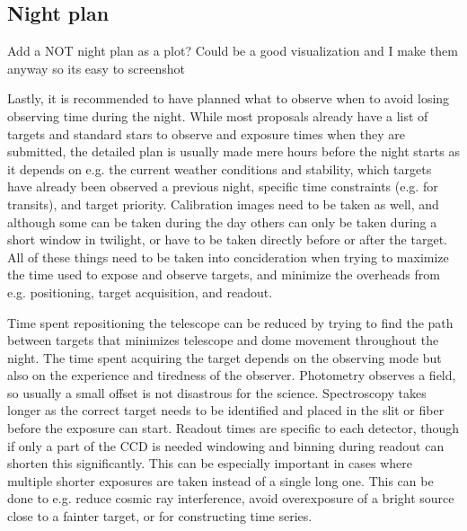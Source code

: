 \documentclass[a4paper,oneside,12pt, class=Latex/Classes/PhDthesisPSnPDF, crop=false]{standalone}
\begin{document}
\subsection{Night plan}
\color{red} Add a NOT night plan as a plot? Could be a good visualization and I make them anyway so its easy to screenshot \color{black}

Lastly, it is recommended to have planned what to observe when to avoid losing observing time during the night. While most proposals already have a list of targets and standard stars to observe and exposure times when they are submitted, the detailed plan is usually made mere hours before the night starts as it depends on e.g. the current weather conditions and stability, which targets have already been observed a previous night, specific time constraints (e.g. for transits), and target priority. Calibration images need to be taken as well, and although some can be taken during the day others can only be taken during a short window in twilight, or have to be taken directly before or after the target. All of these things need to be taken into concideration when trying to maximize the time used to expose and observe targets, and minimize the overheads from e.g. positioning, target acquisition, and readout.

Time spent repositioning the telescope can be reduced by trying to find the path between targets that minimizes telescope and dome movement throughout the night. The time spent acquiring the target depends on the observing mode but also on the experience and tiredness of the observer. Photometry observes a field, so usually a small offset is not disastrous for the science. Spectroscopy takes longer as the correct target needs to be identified and placed in the slit or fiber before the exposure can start. Readout times are specific to each detector, though if only a part of the CCD is needed windowing and binning during readout can shorten this significantly. This can be especially important in cases where multiple shorter exposures are taken instead of a single long one. This can be done to e.g. reduce cosmic ray interference, avoid overexposure of a bright source close to a fainter target, or for constructing time series.
\end{document}
